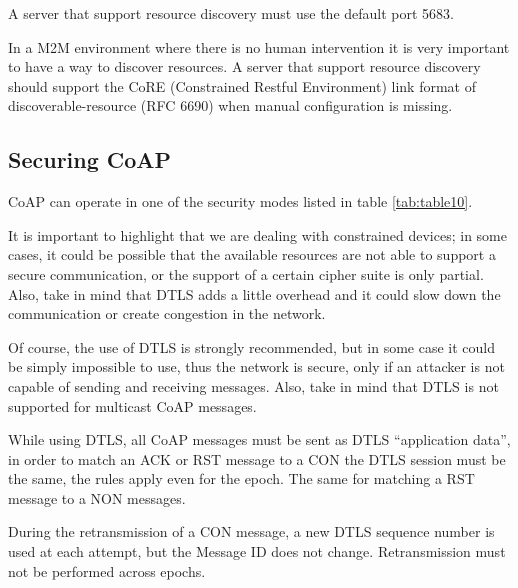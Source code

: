 	A server that support resource discovery must use the default port 5683.\newline
	
	In a M2M environment where there is no human intervention it is very important to have a way to discover resources.\newline
	A server that support resource discovery should support the CoRE (Constrained Restful Environment) link format of discoverable-resource (RFC 6690) when manual configuration is missing.\newline
	
	\subsection{Securing CoAP}
	CoAP can operate in one of the security modes listed in table \ref{tab:table10}.
	
	
	
	It is important to highlight that we are dealing with constrained devices; in some cases, it could be possible that the available resources are not able to support a secure communication, or the support of a certain cipher suite is only partial.\newline
	Also, take in mind that DTLS adds a little overhead and it could slow down the communication or create congestion in the network.\newline
	
	Of course, the use of DTLS is strongly recommended, but in some case it could be simply impossible to use, thus the network is secure, only if an attacker is not capable of sending and receiving messages.\newline
	Also, take in mind that DTLS is not supported for multicast CoAP messages.\newline
	
	While using DTLS, all CoAP messages must be sent as DTLS “application data”, in order to match an ACK or RST message to a CON the DTLS session must be the same, the rules apply even for the epoch.\newline
	The same for matching a RST message to a NON messages.\newline
	
	During the retransmission of a CON message, a new DTLS sequence number is used at each attempt, but the Message ID does not change.\newline
	Retransmission must not be performed across epochs.\newline
	
